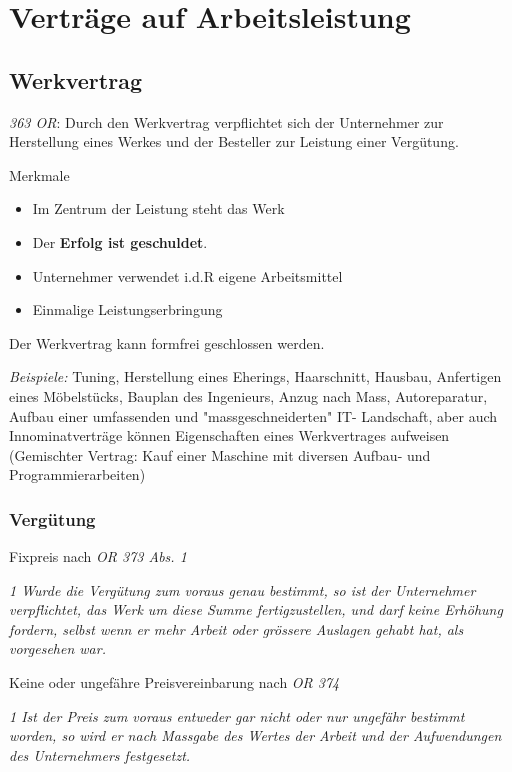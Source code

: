 \chapter{Verträge auf Arbeitsleistung}

\section{Werkvertrag}

\textit{363 OR}: Durch den Werkvertrag verpflichtet sich der Unternehmer zur Herstellung eines Werkes und der Besteller zur Leistung einer Vergütung.

Merkmale
\begin{itemize}
  \item Im Zentrum der Leistung steht das Werk
  \item Der \textbf{Erfolg ist geschuldet}.
  \item Unternehmer verwendet i.d.R eigene Arbeitsmittel
  \item Einmalige Leistungserbringung
\end{itemize}

Der Werkvertrag kann formfrei geschlossen werden. 

\textit{Beispiele:} 
Tuning, Herstellung eines Eherings, Haarschnitt, Hausbau, Anfertigen eines Möbelstücks, Bauplan des Ingenieurs, Anzug nach Mass, Autoreparatur, Aufbau einer umfassenden und "massgeschneiderten" IT- Landschaft, aber auch Innominatverträge können Eigenschaften eines Werkvertrages aufweisen (Gemischter Vertrag: Kauf einer Maschine mit diversen Aufbau- und Programmierarbeiten)

\subsection{Vergütung}

Fixpreis nach \textit{OR 373 Abs. 1}

\textit{1 Wurde die Vergütung zum voraus genau bestimmt, so ist der Unternehmer verpflichtet, das Werk um diese Summe fertigzustellen, und darf keine Erhöhung fordern, selbst wenn er mehr Arbeit oder grössere Auslagen gehabt hat, als vorgesehen war.}
\vspace{3mm}

\noindent
Keine oder ungefähre Preisvereinbarung nach \textit{OR 374}

\textit{1 Ist der Preis zum voraus entweder gar nicht oder nur ungefähr bestimmt worden, so wird er nach Massgabe des Wertes der Arbeit und der Aufwendungen des Unternehmers festgesetzt.}
\vspace{3mm}

